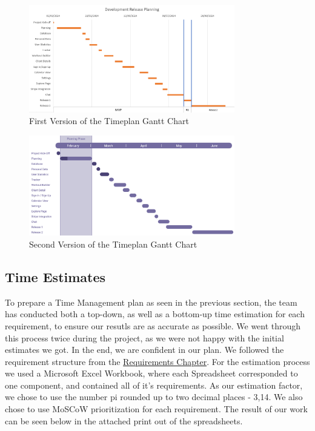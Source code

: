 \begin{figure}[H]
    \centering
    \includegraphics[width=0.8\textwidth]{images/initial_gantt_chart.png}
    \caption{First Version of the Timeplan Gantt Chart}
    \label{fig:initialganttchart}
\end{figure}

\begin{figure}[H]
    \centering
    \includegraphics[width=0.8\textwidth]{images/gantt_chart.png}
    \caption{Second Version of the Timeplan Gantt Chart}
    \label{fig:ganttchart}
\end{figure}

\subsection{Time Estimates}
To prepare a Time Management plan as seen in the previous section, the team has conducted both a top-down, as well as a bottom-up 
time estimation for each requirement, to ensure our resutls are as accurate as possible. We went through this process twice during the
project, as we were not happy with the initial estimates we got. In the end, we are confident in our plan. We followed the requirement
structure from the \hyperref[sec:Requirements]{Requirements Chapter}.
For the estimation process we used a Microsoft Excel Workbook, where each Spreadsheet corresponded to one component, and contained
all of it's requirements. As our estimation factor, we chose to use the number pi rounded up to two decimal places - 3,14. We also chose to
use MoSCoW prioritization for each requirement. The result of our work can be seen below in the attached print out of the spreadsheets.


